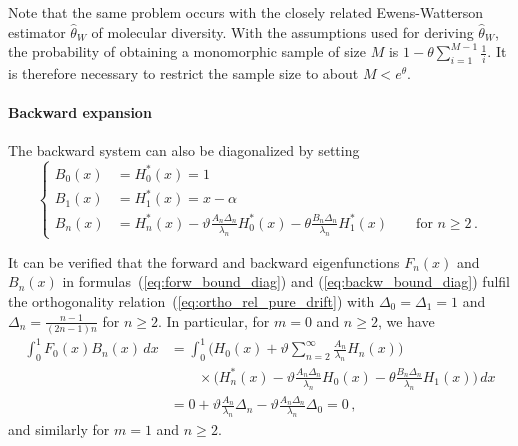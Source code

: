 \documentclass[preprint]{elsarticle}
\begin{document}
Note that the same problem occurs with the closely related Ewens-Watterson estimator $\hat \theta_W$ of molecular diversity. With the assumptions used for deriving $\hat \theta_W$, the probability of obtaining a monomorphic sample of size $M$ is $1-\theta\sum_{i=1}^{M-1} \frac{1}{i}$. It is therefore necessary to restrict the sample size to about $M<e^\theta$. 

\paragraph{Backward expansion} The backward system can also be diagonalized by setting
\begin{equation}\label{eq:backw_bound_diag}
\begin{cases}
    B_0(x)&=H_0^{*}(x)=1\\
    B_1(x)&=H_1^{*}(x)=x-\alpha\\
    B_n(x)&=H_n^{*}(x)-\vartheta \frac{A_n\Delta_n}{\lambda_n} H_0^{*}(x)-\theta \frac{B_n\Delta_n}{\lambda_n} H_1^{*}(x)\qquad\text{for $n\geq 2$}\,.
\end{cases}
\end{equation}

It can be verified that the forward and backward eigenfunctions $F_n(x)$ and $B_n(x)$ in formulas~(\ref{eq:forw_bound_diag}) and (\ref{eq:backw_bound_diag}) fulfil the orthogonality relation~(\ref{eq:ortho_rel_pure_drift}) with $\Delta_0=\Delta_1=1$ and $\Delta_n=\frac{n-1}{(2n-1)n}$ for $n\geq 2$. 
In particular, for $m=0$ and $n\geq 2$, we have
\begin{equation}
\begin{split}
    \int_0^1 F_0(x)B_n(x)\,dx&=\int_0^1 \bigg(H_0(x)+\vartheta \sum_{n=2}^\infty\frac{A_n}{\lambda_n} H_n(x)\bigg)\\
    &\qquad \times \bigg(H_n^{*}(x)-\vartheta \frac{A_n\Delta_n}{\lambda_n} H_0(x)-\theta \frac{B_n\Delta_n}{\lambda_n} H_1(x)\bigg)\,dx\\
    &=0+\vartheta \frac{A_n}{\lambda_n} \Delta_n-\vartheta  \frac{A_n\Delta_n}{\lambda_n} \Delta_0=0\,,
\end{split}
\end{equation}
and similarly for $m=1$ and $n\geq 2$. 
\end{document}
